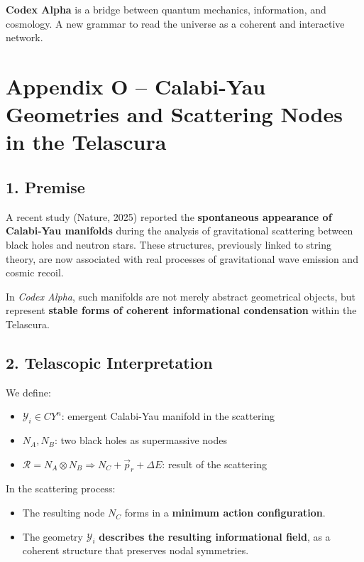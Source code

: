 \documentclass[12pt]{article}
\begin{document}
\bigskip

\noindent \textbf{Codex Alpha} is a bridge between quantum mechanics, information, and cosmology. A new grammar to read the universe as a coherent and interactive network.

\section*{Appendix O – Calabi-Yau Geometries and Scattering Nodes in the Telascura}

\subsection*{1. Premise}
A recent study (Nature, 2025) reported the \textbf{spontaneous appearance of Calabi-Yau manifolds} during the analysis of gravitational scattering between black holes and neutron stars. These structures, previously linked to string theory, are now associated with real processes of gravitational wave emission and cosmic recoil.

In \textit{Codex Alpha}, such manifolds are not merely abstract geometrical objects, but represent \textbf{stable forms of coherent informational condensation} within the Telascura.

\subsection*{2. Telascopic Interpretation}
We define:
\begin{itemize}
    \item $\mathcal{Y}_i \in CY^n$: emergent Calabi-Yau manifold in the scattering
    \item $N_A, N_B$: two black holes as supermassive nodes
    \item $\mathcal{R} = N_A \otimes N_B \Rightarrow N_C + \vec{p}_r + \Delta E$: result of the scattering
\end{itemize}

In the scattering process:
\begin{itemize}
    \item The resulting node $N_C$ forms in a \textbf{minimum action configuration}.
    \item The geometry $\mathcal{Y}_i$ \textbf{describes the resulting informational field}, as a coherent structure that preserves nodal symmetries.
\end{itemize}
\end{document}
